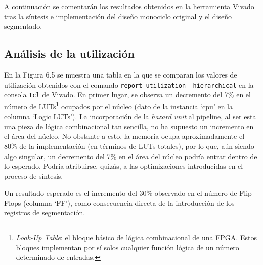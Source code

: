 A continuación se comentarán los resultados obtenidos en la herramienta Vivado tras la síntesis e implementación del diseño monociclo original y el diseño segmentado.

\subsection{Análisis de la utilización}

En la Figura 6.5 se muestra una tabla en la que se comparan los valores de utilización obtenidos con el comando \texttt{report\_utilization -hierarchical} en la consola \texttt{Tcl} de Vivado. En primer lugar, se observa un decremento del 7\% en el número de LUTs\footnote{\textit{Look-Up Table}: el bloque básico de lógica combinacional de una FPGA. Estos bloques implementan por sí solos cualquier función lógica de un número determinado de entradas.} ocupados por el núcleo (dato de la instancia `cpu' en la columna `Logic LUTs').
La incorporación de la \textit{hazard unit} al pipeline, al ser esta una pieza de lógica combinacional tan sencilla, no ha supuesto un incremento en el área del núcleo. No obstante a esto, la memoria ocupa aproximadamente el 80\% de la implementación (en términos de LUTs totales), por lo que, aún siendo algo singular, un decremento del 7\% en el área del núcleo podría entrar dentro de lo esperado. Podría atribuirse, quizás, a las optimizaciones introducidas en el proceso de síntesis.

Un resultado esperado es el incremento del 30\% observado en el número de Flip-Flops (columna `FF'), como consecuencia directa de la introducción de los registros de segmentación.

